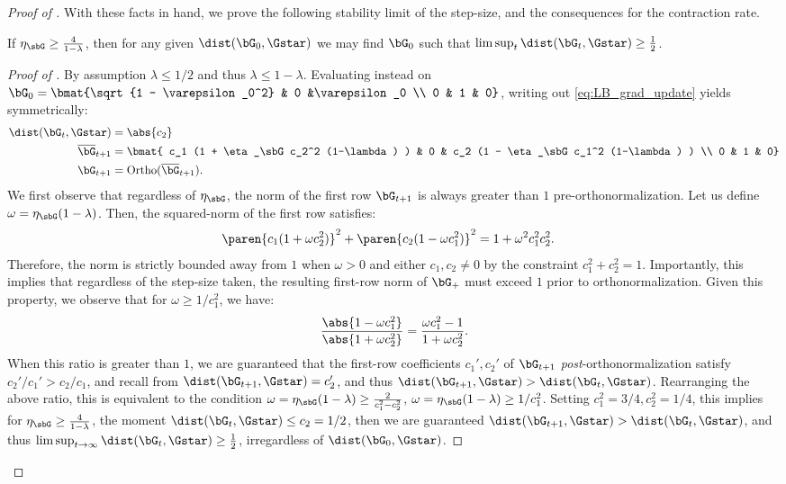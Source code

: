 \begin{proof}[Proof of ]
With these facts in hand, we prove the following stability limit of the step-size, and the consequences for the contraction rate.
\begin{lemma}\label{lem:LB_max_lr}
    If $\eta_\sbG \geq \frac{4}{1-\lambda}$, then for any given $\dist(\bG_0, \Gstar)$ we may find $\bG_0$ such that $\limsup_t \dist(\bG_t, \Gstar) \geq \frac{1}{2}$.
\end{lemma}
\begin{proof}[Proof of ]
    By assumption $\lambda \leq 1/2$ and thus $\lambda \leq 1- \lambda$. Evaluating  instead on $\bG_0 = \bmat{\sqrt{1 - \varepsilon_0^2} & 0 &\varepsilon_0 \\ 0 & 1 & 0}$, writing out \eqref{eq:LB_grad_update} yields symmetrically:
\begin{align*}
    \dist(\bG_t, \Gstar) &= \abs{c_2} \\
    \overline\bG_{t+1} &= \bmat{
        c_1 (1 + \eta_\sbG c_2^2 (1-\lambda) ) & 0 & c_2 (1 - \eta_\sbG c_1^2 (1-\lambda) ) \\
        0 & 1 & 0} \\
    \bG_{t+1} &= \mathrm{Ortho}(\overline\bG_{t+1}).
\end{align*}
We first observe that regardless of $\eta_\sbG$, the norm of the first row $\bG_{t+1}$ is always greater than $1$ pre-orthonormalization. Let us define $\omega = \eta_\sbG(1-\lambda)$. Then, the squared-norm of the first row satisfies:
\begin{align*}
    \paren{c_1 (1+ \omega c_2^2)}^2 + \paren{c_2 (1 - \omega c_1^2)}^2 &= 1 + \omega^2 c_1^2 c_2^2. 
\end{align*}
Therefore, the norm is strictly bounded away from $1$ when $\omega > 0$ and either $c_1,c_2\neq 0$ by the constraint $c_1^2 + c_2^2 = 1$. Importantly, this implies that regardless of the step-size taken, the resulting first-row norm of $\bG_+$ must exceed $1$ prior to orthonormalization. Given this property, we observe that for $\omega \geq 1/c_1^2$, we have:
\begin{align*}
    \frac{\abs{1-\omega c_1^2}}{\abs{1+\omega c_2^2}} = \frac{\omega c_1^2 - 1}{1 + \omega c_2^2}.
\end{align*}
When this ratio is greater than $1$, we are guaranteed that the first-row coefficients $c_1', c_2'$ of $\bG_{t+1}$ \textit{post}-orthonormalization satisfy $c_2'/c_1' > c_2/c_1$, and recall from  $\dist(\bG_{t+1}, \Gstar) = c_2'$, and thus $\dist(\bG_{t+1}, \Gstar) > \dist(\bG_t, \Gstar)$. Rearranging the above ratio, this is equivalent to the condition $\omega = \eta_\sbG (1-\lambda) \geq \frac{2}{c_1^2 - c_2^2}$, $\omega = \eta_\sbG (1-\lambda) \geq 1/c_1^2$. Setting $c_1^2 = 3/4, c_2^2 = 1/4$, this implies for $\eta_\sbG \geq \frac{4}{1-\lambda}$, the moment $\dist(\bG_t, \Gstar) \leq c_2 = 1/2$, then we are guaranteed $\dist(\bG_{t+1}, \Gstar) > \dist(\bG_t, \Gstar)$, and thus $\limsup_{t \to \infty} \dist(\bG_t, \Gstar) \geq \frac{1}{2}$, irregardless of $\dist(\bG_0, \Gstar)$.
\end{proof}


\end{proof}
